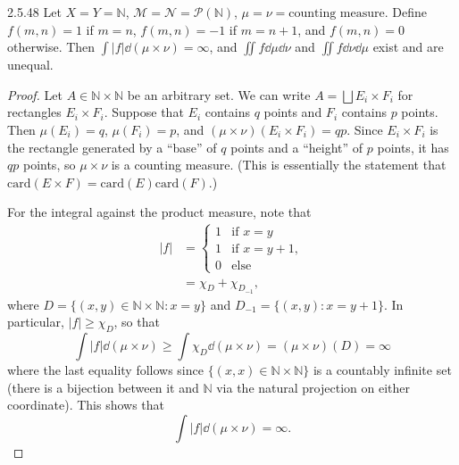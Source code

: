 \documentclass[11pt]{article}
\begin{document}
\begin{problem}{2.5.48}
  Let \( X = Y = \mathbb{N} \), \( \mathcal{M} = \mathcal{N} = \mathcal{P}(\mathbb{N}) \), \( \mu = \nu = \text{counting measure} \).
  Define \( f(m,n) = 1 \) if \( m = n \), \( f(m,n) = -1 \) if \( m = n+1 \), and \( f(m,n) = 0 \) otherwise.
  Then \( \int |f| \dd{(\mu \times \nu)} = \infty \), and \( \iint f \dd{\mu}\dd{\nu} \) and \( \iint f \dd{\nu}\dd{\mu} \) exist and are unequal.
\end{problem}
\begin{proof}
  Let \( A \in \mathbb{N} \times \mathbb{N} \) be an arbitrary set.
  We can write \( A = \bigsqcup E_i \times F_i \) for rectangles \( E_i \times F_i \).
  Suppose that \( E_i \) contains \( q \) points and \( F_i \) contains \( p \) points.
  Then \( \mu(E_i) = q \), \( \mu(F_i) = p \), and \( (\mu \times \nu)(E_i \times F_i) = qp \).
  Since \( E_i \times F_i \) is the rectangle generated by a ``base'' of \( q \) points and a ``height'' of \( p \) points, it has \( qp \) points, so \( \mu \times \nu \) is a counting measure. (This is essentially the statement that \( \text{card}(E \times F) = \text{card}(E)\text{card}(F) \).)

  For the integral against the product measure, note that
  \begin{equation}
  \label{eq:23}
  \begin{aligned}
  |f| &= \begin{cases}
    1 & \text{if } x = y \\
    1 & \text{if } x = y + 1,\\
    0 & \text{else}
  \end{cases} \\
    &= \chi_D + \chi_{D_{-1}},
  \end{aligned}
\end{equation}
where \( D = \{(x,y) \in \mathbb{N} \times \mathbb{N} : x = y\} \) and \( D_{-1} = \{(x,y): x = y+1\} \).
In particular, \( |f| \geq \chi_D \), so that
\begin{equation}
\label{eq:24}
\int |f| \dd(\mu \times \nu) \geq \int \chi_D \dd(\mu \times \nu) = (\mu \times \nu)(D) = \infty
\end{equation}
where the last equality follows since \( \{(x,x) \in \mathbb{N} \times \mathbb{N}\} \) is a countably infinite set (there is a bijection between it and \( \mathbb{N} \) via the natural projection on either coordinate).
This shows that
\begin{equation}
\label{eq:25}
\int |f| \dd(\mu \times \nu) = \infty.
\end{equation}


\end{proof}
\end{document}
